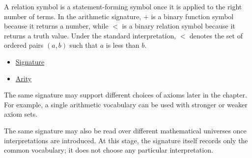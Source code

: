\begin{remark*}[Interpretation]
A relation symbol is a statement-forming symbol once it is applied to the
right number of terms. In the arithmetic signature, $+$ is a binary function
symbol because it returns a number, while $<$ is a binary relation symbol
because it returns a truth value. Under the standard interpretation,
$<$ denotes the set of ordered pairs $(a,b)$ such that $a$ is less than $b$.
\end{remark*}

\begin{dependencies}
\begin{itemize}
  \item \hyperref[def:signature]{Signature}
  \item \hyperref[def:arity]{Arity}
\end{itemize}
\end{dependencies}

\begin{remark*}
The same signature may support different choices of axioms later in the
chapter. For example, a single arithmetic vocabulary can be used with stronger
or weaker axiom sets.

The same signature may also be read over different mathematical universes once
interpretations are introduced. At this stage, the signature itself records
only the common vocabulary; it does not choose any particular interpretation.
\end{remark*}
